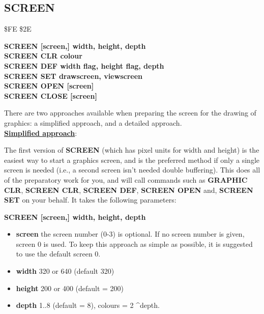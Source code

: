 \subsection{SCREEN}
\begin{description}[leftmargin=2cm,style=nextline]
\item [Token:] \$FE \$2E
\item [Format:] {\bf SCREEN [screen,] width, height, depth} \\
                {\bf SCREEN CLR colour} \\
                {\bf SCREEN DEF width flag, height flag, depth} \\
                {\bf SCREEN SET drawscreen, viewscreen} \\
                {\bf SCREEN OPEN [screen]} \\
                {\bf SCREEN CLOSE [screen]}

\item [Usage:] There are two approaches available when preparing the screen for the
               drawing of graphics: a simplified approach, and a detailed approach.
\\
    \underline{{\bf Simplified approach}}:

               The first version of {\bf SCREEN} (which has pixel
               units for width and height) is the easiest
               way to start a graphics screen, and is the preferred
               method if only a single screen is needed (i.e., a second screen
               isn't needed double buffering). This does all of the
               preparatory work for you, and will call commands such as
               {\bf GRAPHIC CLR}, {\bf SCREEN CLR}, {\bf SCREEN DEF},
               {\bf SCREEN OPEN} and, {\bf SCREEN SET}
               on your behalf. It takes the following parameters:

               {\bf SCREEN [screen,] width, height, depth}

               \begin{itemize}
                \item {\bf screen} the screen number (0-3) is optional.
                If no screen number is given, screen 0 is used. To keep
                   this approach as simple as possible, it is suggested to
                   use the default screen 0.
                \item {\bf width} 320 or 640 (default 320)
                \item {\bf height} 200 or 400 (default = 200)
                \item {\bf depth} 1..8 (default = 8),
                   colours = 2 \textasciicircum depth.
               \end{itemize}


\end{description}
